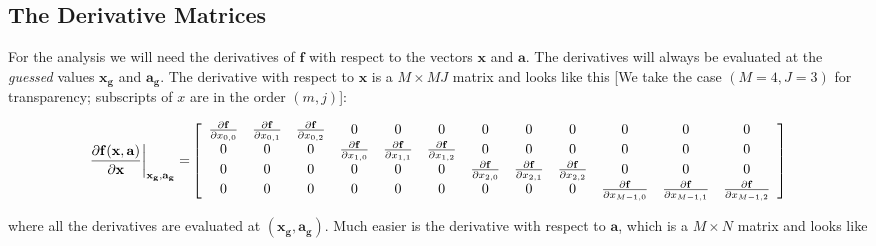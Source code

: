 \documentclass[psfig,preprint]{aastex}
\begin{document}
\subsection{The Derivative Matrices}

For the analysis we will need the derivatives of $\mathbf{f}$ with
respect to the vectors $\mathbf{x}$ and $\mathbf{a}$.  The derivatives
will always be evaluated at the {\it guessed} values $\mathbf{x_g}$ and
$\mathbf{a_g}$.  The derivative with respect to $\mathbf x$ is a $M
\times MJ$ matrix and looks like this [We take the case $(M=4,J=3)$ for
transparency; subscripts of $x$ are in the order $(m,j)$]:

{\scriptsize
\begin{eqnarray}
\mathbf{ \left.{ \partial f(x, a) \over \partial x}\right|_{x_g, a_g}  = }
\left[
\begin{array}{cccccccccccc}
{ \mathbf {\partial f} \over \partial x_{0,0}} &
{ \mathbf {\partial f} \over \partial x_{0,1}} &
{ \mathbf {\partial f} \over \partial x_{0,2}} &
0 & 0 & 0 & 0 & 0 & 0 & 0 & 0 & 0 \\
0 & 0 & 0 & 
{ \mathbf {\partial f} \over \partial x_{1,0}} &
{ \mathbf {\partial f} \over \partial x_{1,1}} &
{ \mathbf {\partial f} \over \partial x_{1,2}} &
0 & 0 & 0 & 0 & 0 & 0 \\
0 & 0 & 0 & 0 & 0 & 0 &  
{ \mathbf {\partial f} \over \partial x_{2,0}} &
{ \mathbf {\partial f} \over \partial x_{2,1}} &
{ \mathbf {\partial f} \over \partial x_{2,2}} &
0 & 0 & 0  \\
0 & 0 & 0 & 0 & 0 & 0 & 0 & 0 & 0 & 
{ \mathbf {\partial f} \over \partial x_{M-1,0}} &
{ \mathbf {\partial f} \over \partial x_{M-1,1}} &
{ \mathbf {\partial f} \over \partial x_{M-1,2}} \\
\end{array}
\right]
\end{eqnarray}
}

\noindent where all the derivatives are evaluated at $(\mathbf{ x_g,
a_g})$. Much easier is the derivative with respect to $\mathbf a$, which is a $M
\times N$ matrix and looks like 
\end{document}
